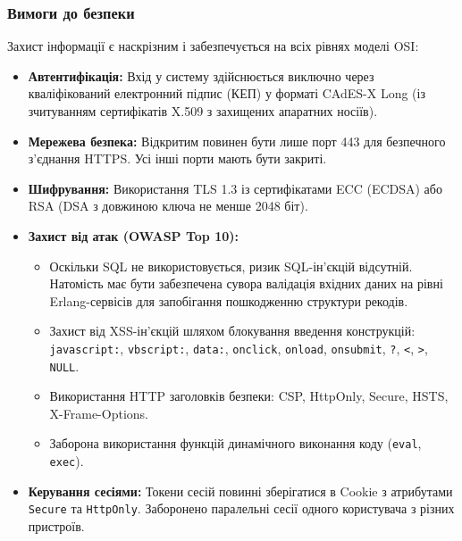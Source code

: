 \documentclass{article}
\begin{document}
\subsubsection{Вимоги до безпеки}
Захист інформації є наскрізним і забезпечується на всіх рівнях моделі OSI:
\begin{itemize}
    \item \textbf{Автентифікація:} Вхід у систему здійснюється виключно через кваліфікований електронний підпис (КЕП) у форматі CAdES-X Long (із зчитуванням сертифікатів X.509 з захищених апаратних носіїв).
    \item \textbf{Мережева безпека:} Відкритим повинен бути лише порт 443 для безпечного з'єднання HTTPS. Усі інші порти мають бути закриті.
    \item \textbf{Шифрування:} Використання TLS 1.3 із сертифікатами ECC (ECDSA) або RSA (DSA з довжиною ключа не менше 2048 біт).
    \item \textbf{Захист від атак (OWASP Top 10):}
    \begin{itemize}
        \item Оскільки SQL не використовується, ризик SQL-ін'єкцій відсутній. Натомість має бути забезпечена сувора валідація вхідних даних на рівні Erlang-сервісів для запобігання пошкодженню структури рекодів.
        \item Захист від XSS-ін'єкцій шляхом блокування введення конструкцій: \texttt{javascript:}, \texttt{vbscript:}, \texttt{data:}, \texttt{onclick}, \texttt{onload}, \texttt{onsubmit}, \texttt{?}, \texttt{<}, \texttt{>}, \texttt{NULL}.
        \item Використання HTTP заголовків безпеки: CSP, HttpOnly, Secure, HSTS, X-Frame-Options.
        \item Заборона використання функцій динамічного виконання коду (\texttt{eval}, \texttt{exec}).
    \end{itemize}
    \item \textbf{Керування сесіями:} Токени сесій повинні зберігатися в Cookie з атрибутами \texttt{Secure} та \texttt{HttpOnly}. Заборонено паралельні сесії одного користувача з різних пристроїв.
\end{itemize}
\end{document}
